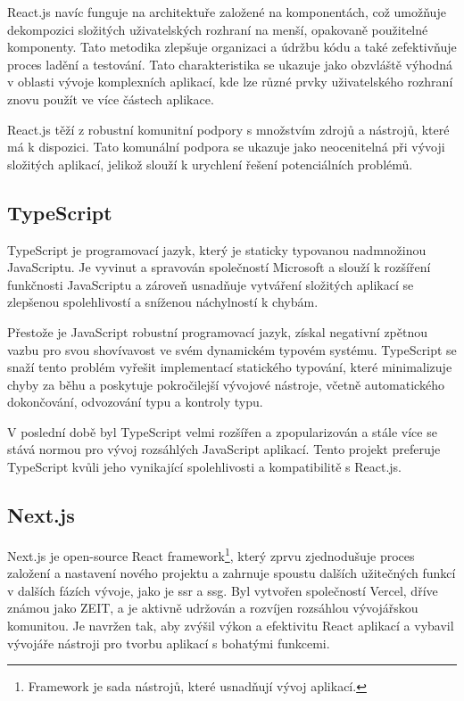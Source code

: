 React.js navíc funguje na architektuře založené na komponentách, což umožňuje dekompozici složitých uživatelských rozhraní na menší, opakovaně použitelné komponenty.
Tato metodika zlepšuje organizaci a údržbu kódu a také zefektivňuje proces ladění a testování\cite{r_learn_describing_the_ui}.
Tato charakteristika se ukazuje jako obzvláště výhodná v oblasti vývoje komplexních aplikací, kde lze různé prvky uživatelského rozhraní znovu použít ve více částech aplikace.

React.js těží z robustní komunitní podpory s množstvím zdrojů a nástrojů, které má k dispozici.
Tato komunální podpora se ukazuje jako neocenitelná při vývoji složitých aplikací, jelikož slouží k urychlení řešení potenciálních problémů.

\subsection{TypeScript}
\label{subsec:implementace-technologie-typescript}
TypeScript je programovací jazyk, který je staticky typovanou nadmnožinou JavaScriptu.
Je vyvinut a spravován společností Microsoft a slouží k rozšíření funkčnosti JavaScriptu a zároveň usnadňuje vytváření složitých aplikací se zlepšenou spolehlivostí a sníženou náchylností k chybám\cite{g_www_geeksforgeeks_org_difference_between_typescript_and_javascript}.

Přestože je JavaScript robustní programovací jazyk, získal negativní zpětnou vazbu pro svou shovívavost ve svém dynamickém typovém systému.
TypeScript se snaží tento problém vyřešit implementací statického typování, které minimalizuje chyby za běhu a poskytuje pokročilejší vývojové nástroje, včetně automatického dokončování, odvozování typu a kontroly typu\cite{g_www_geeksforgeeks_org_difference_between_typescript_and_javascript}.

V poslední době byl TypeScript velmi rozšířen a zpopularizován a stále více se stává normou pro vývoj rozsáhlých JavaScript aplikací\cite{ct_the_relevance_of_typescript_in_2022_}.
Tento projekt preferuje TypeScript kvůli jeho vynikající spolehlivosti a kompatibilitě s React.js.

\subsection{Next.js}
\label{subsec:implementace-technologie-nextjs}
Next.js je open-source React framework\footnote{Framework je sada nástrojů, které usnadňují vývoj aplikací.}, který zprvu zjednodušuje proces založení a nastavení nového projektu a zahrnuje spoustu dalších užitečných funkcí v dalších fázích vývoje, jako je \ac{ssr} a \ac{ssg}.
Byl vytvořen společností Vercel, dříve známou jako ZEIT, a je aktivně udržován a rozvíjen rozsáhlou vývojářskou komunitou.
Je navržen tak, aby zvýšil výkon a efektivitu React aplikací a vybavil vývojáře nástroji pro tvorbu aplikací s bohatými funkcemi\cite{n_nextjs_org_docs}.

